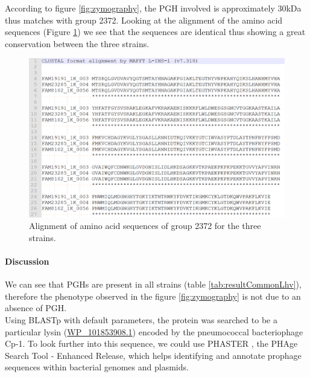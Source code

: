 \documentclass[10pt,a4paper]{article}
\begin{document}
According to figure \ref{fig:zymography}, the PGH involved is approximately 30kDa thus matches with group 2372. Looking at the alignment of the amino acid sequences (Figure \ref{fig:alignmentgrp2372}) we see that the sequences are identical thus showing a great conservation between the three strains. \\




\begin{figure}
	\centering
	\includegraphics[width=0.6\linewidth]{img/AlignmentGrp2372}
	\caption{Alignment of amino acid sequences of group 2372 for the three strains.}
	\label{fig:alignmentgrp2372}
\end{figure}








\paragraph{Discussion} We can see that PGHs are present in all strains (table \ref{tab:resultCommonLhv}), therefore the phenotype observed in the figure \ref{fig:zymography} is not due to an absence of PGH.\\

Using BLASTp\cite{altschul_gapped_1997} with default parameters, the protein was searched to be a particular lysin (\href{https://www.ncbi.nlm.nih.gov/protein/1325986555}{WP\_101853908.1}) encoded by the pneumococcal bacteriophage Cp-1\cite{martin_pneumococcal_1998}. To look further into this sequence, we could use PHASTER \cite{arndt_phaster:_2016}, the PHAge Search Tool - Enhanced Release, which helps identifying and annotate prophage sequences within bacterial genomes and plasmids. 

\end{document}
